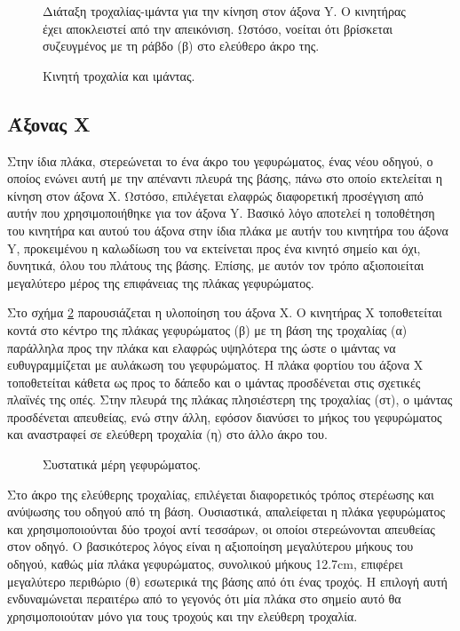 \begin{figure}
    \caption{Κινητή τροχαλία και ιμάντας. \label{fig:construct:belt-pulley-y}}
Διάταξη τροχαλίας-ιμάντα για την κίνηση στον άξονα Y. Ο κινητήρας έχει
αποκλειστεί από την απεικόνιση. Ωστόσο, νοείται ότι βρίσκεται συζευγμένος με τη
ράβδο (β) στο ελεύθερο άκρο της.
    \begin{center}%
    \def\svgwidth{0.7\textwidth}
    
    \end{center}
\end{figure}


\subsection{Άξονας X}
\label{subsec:construct:x}

Στην ίδια πλάκα, στερεώνεται το ένα άκρο του γεφυρώματος, ένας νέου οδηγού, ο
οποίος ενώνει αυτή με την απέναντι πλευρά της βάσης, πάνω στο οποίο εκτελείται η
κίνηση στον άξονα X.
Ωστόσο, επιλέγεται ελαφρώς διαφορετική προσέγγιση από αυτήν που χρησιμοποιήθηκε
για τον άξονα Y. Βασικό λόγο αποτελεί η τοποθέτηση του κινητήρα και αυτού του
άξονα στην ίδια πλάκα με αυτήν του κινητήρα του άξονα Y, προκειμένου η καλωδίωση
του να εκτείνεται προς ένα κινητό σημείο και όχι, δυνητικά, όλου του πλάτους της
βάσης. Επίσης, με αυτόν τον τρόπο αξιοποιείται μεγαλύτερο μέρος της επιφάνειας
της πλάκας γεφυρώματος.

Στο σχήμα \ref{fig:construct:x-axis-schem} παρουσιάζεται η υλοποίηση του άξονα
X.
Ο κινητήρας X τοποθετείται κοντά στο κέντρο της πλάκας γεφυρώματος (β) με τη
βάση της τροχαλίας (α) παράλληλα προς την πλάκα και ελαφρώς υψηλότερα της ώστε ο
ιμάντας να ευθυγραμμίζεται με αυλάκωση του γεφυρώματος. Η πλάκα φορτίου του
άξονα X τοποθετείται κάθετα ως προς το δάπεδο και ο ιμάντας προσδένεται στις
σχετικές πλαϊνές της οπές. Στην πλευρά της πλάκας πλησιέστερη της τροχαλίας
(στ), ο ιμάντας προσδένεται απευθείας, ενώ στην άλλη, εφόσον διανύσει το μήκος
του γεφυρώματος και αναστραφεί σε ελεύθερη τροχαλία (η) στο άλλο άκρο του.

\begin{figure}
    \caption{Συστατικά μέρη γεφυρώματος. \label{fig:construct:x-axis-schem}}
    \begin{center}%
    \def\svgwidth{\textwidth}
    
    \end{center}
\end{figure}

Στο άκρο της ελεύθερης τροχαλίας, επιλέγεται διαφορετικός τρόπος στερέωσης και
ανύψωσης του οδηγού από τη βάση. Ουσιαστικά, απαλείφεται η πλάκα γεφυρώματος και
χρησιμοποιούνται δύο τροχοί αντί τεσσάρων, οι οποίοι στερεώνονται απευθείας στον
οδηγό. Ο βασικότερος λόγος είναι η αξιοποίηση μεγαλύτερου μήκους του οδηγού,
καθώς μία πλάκα γεφυρώματος, συνολικού μήκους 12.7cm, επιφέρει μεγαλύτερο
περιθώριο (θ) εσωτερικά της βάσης από ότι ένας τροχός. Η επιλογή αυτή
ενδυναμώνεται περαιτέρω από το γεγονός ότι μία πλάκα στο σημείο αυτό θα
χρησιμοποιούταν μόνο για τους τροχούς και την ελεύθερη τροχαλία.

